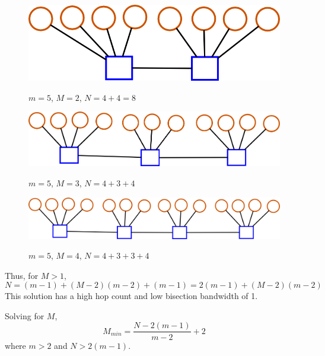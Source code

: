 \documentclass[pdftex]{article}
\begin{document}
\begin{figure}[h!]
\begin{center}
\includegraphics[scale=0.3]{pictures/N8_n1_M2_m5}
\label{fig:neq18}
 \caption{$m=5$, $M=2$, $N=4+4=8$}
\end{center}
\end{figure}

\begin{figure}[h!]
\begin{center}
\includegraphics[scale=0.3]{pictures/N11_n1_M3_m5}
\label{fig:neq111}
 \caption{$m=5$, $M=3$, $N=4+3+4$}
\end{center}
\end{figure}

\begin{figure}[h!]
\begin{center}
\includegraphics[scale=0.3]{pictures/N14_n1_M4_m5}
\label{fig:neq114}
 \caption{$m=5$, $M=4$, $N=4+3+3+4$}
\end{center}
\end{figure}

Thus, for $M>1$, 
\begin{equation}
 N=(m-1)+(M-2)(m-2)+(m-1)=2(m-1)+(M-2)(m-2)
\end{equation}
This solution has a high hop count and low bisection bandwidth of 1.

Solving for $M$,
\begin{equation}
\boxed{
M_{min}= \frac{N-2(m-1)}{m-2}+2
}
\label{eq:maximum_neq1}
\end{equation}
where $m>2$ and $N>2(m-1)$.
\end{document}
